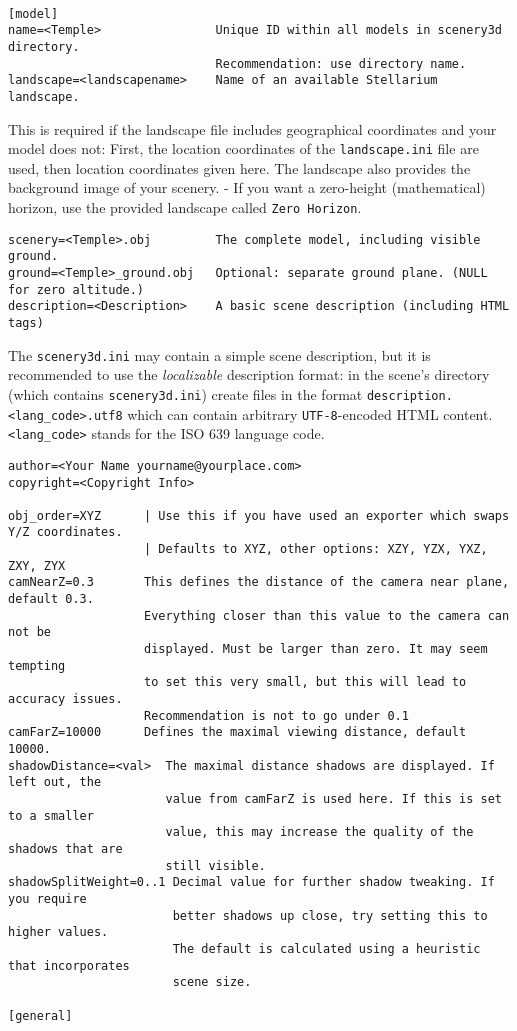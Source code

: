 \documentclass[a4paper]{article}
\newcommand{\filename}[1]{\texttt{#1}}
\newcommand{\cmd}[1]{\texttt{#1}}
\begin{document}
\begin{verbatim}

[model]
name=<Temple>                Unique ID within all models in scenery3d directory.
                             Recommendation: use directory name.
landscape=<landscapename>    Name of an available Stellarium landscape.
\end{verbatim}
This is required if the landscape file includes geographical
coordinates and your model does not: First, the location coordinates
of the \filename{landscape.ini} file are used, then location coordinates given here.
The landscape also provides the background image of your scenery. - If
you want a zero-height (mathematical) horizon, use the provided
landscape called \filename{Zero Horizon}.
\begin{verbatim}
scenery=<Temple>.obj         The complete model, including visible ground.
ground=<Temple>_ground.obj   Optional: separate ground plane. (NULL for zero altitude.)
description=<Description>    A basic scene description (including HTML tags)
\end{verbatim}
The \filename{scenery3d.ini} may contain a simple scene description, but it is
recommended to use the \emph{localizable} description format: in the scene's
directory (which contains \filename{scenery3d.ini}) create files in the format
\filename{description.<lang\_code>.utf8} which can contain arbitrary
\cmd{UTF-8}-encoded HTML content. \cmd{<lang\_code>} stands for the ISO 639
language code.
\begin{verbatim}
author=<Your Name yourname@yourplace.com>
copyright=<Copyright Info>

obj_order=XYZ      | Use this if you have used an exporter which swaps Y/Z coordinates.
                   | Defaults to XYZ, other options: XZY, YZX, YXZ, ZXY, ZYX
camNearZ=0.3       This defines the distance of the camera near plane, default 0.3.
                   Everything closer than this value to the camera can not be 
                   displayed. Must be larger than zero. It may seem tempting 
                   to set this very small, but this will lead to accuracy issues. 
                   Recommendation is not to go under 0.1
camFarZ=10000      Defines the maximal viewing distance, default 10000.
shadowDistance=<val>  The maximal distance shadows are displayed. If left out, the
                      value from camFarZ is used here. If this is set to a smaller
                      value, this may increase the quality of the shadows that are
                      still visible.
shadowSplitWeight=0..1 Decimal value for further shadow tweaking. If you require
                       better shadows up close, try setting this to higher values.
                       The default is calculated using a heuristic that incorporates
                       scene size.

[general]
\end{verbatim}
\end{document}
